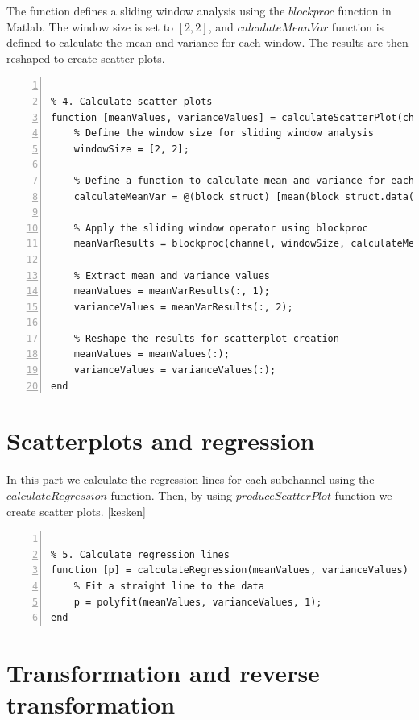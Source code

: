 \documentclass[12pt,a4paper,english
]{tunithesis}
\begin{document}
The function defines a sliding window analysis using the $blockproc$ function in Matlab. The window size is set to $[2, 2]$, and $calculateMeanVar$ function is defined to calculate the mean and variance for each window. The results are then reshaped to create scatter plots.
\begin{lstlisting}[style=Matlab-editor, numbers=left, basicstyle=\small]

% 4. Calculate scatter plots
function [meanValues, varianceValues] = calculateScatterPlot(channel)
    % Define the window size for sliding window analysis
    windowSize = [2, 2];

    % Define a function to calculate mean and variance for each window
    calculateMeanVar = @(block_struct) [mean(block_struct.data(:)), var(block_struct.data(:))];

    % Apply the sliding window operator using blockproc
    meanVarResults = blockproc(channel, windowSize, calculateMeanVar);

    % Extract mean and variance values
    meanValues = meanVarResults(:, 1);
    varianceValues = meanVarResults(:, 2);

    % Reshape the results for scatterplot creation
    meanValues = meanValues(:);
    varianceValues = varianceValues(:);
end
\end{lstlisting}


\section{Scatterplots and regression}
In this part we calculate the regression lines for each subchannel using the $calculateRegression$ function. Then, by using $produceScatterPlot$ function we create scatter plots. [kesken]
\begin{lstlisting}[style=Matlab-editor, numbers=left, basicstyle=\small]

% 5. Calculate regression lines
function [p] = calculateRegression(meanValues, varianceValues)
    % Fit a straight line to the data
    p = polyfit(meanValues, varianceValues, 1);
end
\end{lstlisting}

\section{Transformation and reverse transformation}
\end{document}
